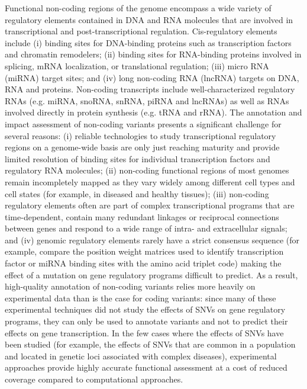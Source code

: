 Functional non-coding regions of the genome encompass a wide variety of regulatory elements contained in DNA and RNA molecules that are involved in transcriptional and post-transcriptional regulation. Cis-regulatory elements include (i) binding sites for DNA-binding proteins such as transcription factors and chromatin remodelers; (ii) binding sites for RNA-binding proteins involved in splicing, mRNA localization, or translational regulation; (iii) micro RNA (miRNA) target sites; and (iv) long non-coding RNA (lncRNA) targets on DNA, RNA and proteins. Non-coding transcripts include well-characterized regulatory RNAs (e.g. miRNA, snoRNA, snRNA, piRNA and lncRNAs) as well as RNAs involved directly in protein synthesis (e.g. tRNA and rRNA).  The annotation and impact assessment of non-coding variants presents a significant challenge for several reasons: (i) reliable technologies to study transcriptional regulatory regions on a genome-wide basis are only just reaching maturity and provide limited resolution of binding sites for individual transcription factors and regulatory RNA molecules; (ii) non-coding functional regions of most genomes remain incompletely mapped as they vary widely among different cell types and cell states (for example, in diseased and healthy tissues); (iii) non-coding regulatory elements often are part of complex transcriptional programs that are time-dependent, contain many redundant linkages or reciprocal connections between genes and respond to a wide range of intra- and extracellular signals; and (iv) genomic regulatory elements rarely have a strict consensus sequence (for example, compare the position weight matrices used to identify transcription factor or miRNA binding sites with the amino acid triplet code) making the effect of a mutation on gene regulatory programs difficult to predict. As a result, high-quality annotation of non-coding variants relies more heavily on experimental data than is the case for coding variants: since many of these experimental techniques did not study the effects of SNVs on gene regulatory programs, they can only be used to annotate variants and not to predict their effects on gene transcription. In the few cases where the effects of SNVs have been studied (for example, the effects of SNVs that are common in a population and located in genetic loci associated with complex diseases), experimental approaches provide highly accurate functional assessment at a cost of reduced coverage compared to computational approaches.

